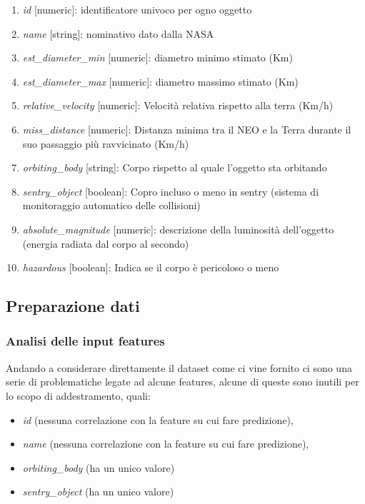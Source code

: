 \documentclass[italian,12pt,a4paper]{article}
\begin{document}
	\begin{enumerate}
		\item \textit{id} [numeric]: identificatore univoco per ogno oggetto
		\item \textit{name} [string]: nominativo dato dalla NASA
		\item \textit{est\_diameter\_min} [numeric]: diametro minimo stimato (Km)
		\item \textit{est\_diameter\_max} [numeric]: diametro massimo stimato (Km)
		\item \textit{relative\_velocity} [numeric]: Velocità relativa rispetto alla terra (Km/h)
		\item \textit{miss\_distance }[numeric]: Distanza minima tra il NEO e la Terra durante il suo passaggio più ravvicinato (Km/h)
		\item \textit{orbiting\_body} [string]: Corpo rispetto al quale l’oggetto sta orbitando
		\item \textit{sentry\_object} [boolean]: Copro incluso o meno in sentry (sistema di monitoraggio automatico delle collisioni)
		\item \textit{absolute\_magnitude} [numeric]: descrizione della luminosità dell’oggetto (energia radiata dal corpo al secondo)
		\item \textit{hazardous} [boolean]: Indica se il corpo è pericoloso o meno
	\end{enumerate}
	
	\subsection{Preparazione dati}
	
	\subsubsection{Analisi delle input features}
	Andando a considerare direttamente il dataset come ci vine fornito ci sono una serie di problematiche legate ad alcune features, alcune di queste sono inutili per lo scopo di addestramento, quali: 
	
	\begin{itemize}
		\item \textit{id} (nessuna correlazione con la feature su cui fare predizione),
		\item \textit{name} (nessuna correlazione con la feature su cui fare predizione), 
		\item \textit{orbiting\_body} (ha un unico valore)
		\item \textit{sentry\_object} (ha un unico valore)
	\end{itemize}
	
\end{document}
